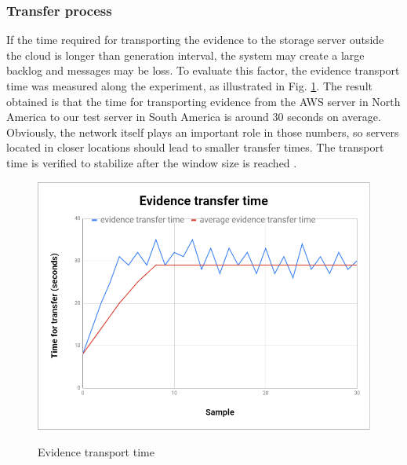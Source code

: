 \documentclass[conference]{IEEEtran}
\newcommand{\marcos}[1]{{\color{green}{MARCOS: #1}}}
\begin{document}
\subsubsection{Transfer process}
If the time required for transporting the evidence to the storage server outside the cloud is longer than generation interval, the system may create a large backlog and messages may be loss.
%
%
To evaluate this factor, the evidence transport time was measured along the experiment, as illustrated in Fig. \ref{fig:evidencia_transporte}.
%
The result obtained is that the time for transporting evidence from the AWS server in North America to our test server in South America is around 30 seconds on average.
%
Obviously, the network itself plays an important role in those numbers, so servers located in closer locations should lead to smaller transfer times.
%
The transport time is verified to stabilize after the window size is reached \marcos{Se for chamar a atenção pra isso, precisa explicar a razão, ou pelo menos tentar dar uma explicação pra isso... pra mim não é óbvio (uma possibilidade é que o tempo inicial foi maior pela demora em estabelecer uma conexão, mas só você pra dizer se esse tempo está ou não incluso no gráfico; além disso, tem o problema do ``0 sample'' que levantei no caption da figura). Uma outra opção é simplesmente suprimir esse comentário (não me parece altamente relevante)}. 
%
%
%

\begin{figure}[htb!]
\footnotesize
\caption{Evidence transport time \marcos{Não entendi a razão para começar com 0 samples e ter um tempo de ~9 segundos... Enfim, para transportar 0 samples o tempo deveria ser 0, não? Tem algo muito esquisito aqui...}}
\includegraphics[scale=0.44]{evidencia_download_ieee.png}
\centering
\label{fig:evidencia_transporte}
\end{figure}
\end{document}
